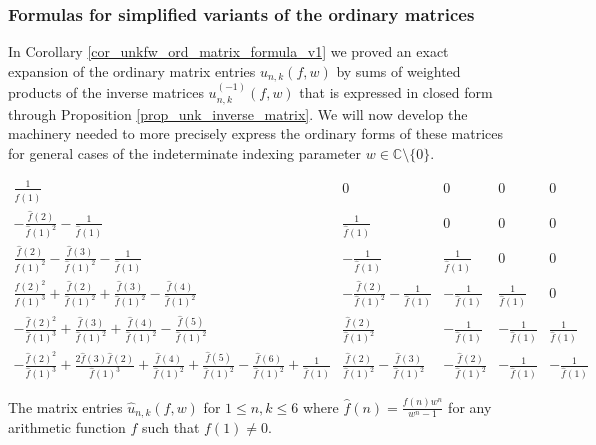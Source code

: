 \documentclass[12pt,reqno,a4letter]{article}
\numberwithin{figure}{section}
\numberwithin{table}{section}
\numberwithin{equation}{section}
\theoremstyle{plain}
\numberwithin{theorem}{section}
\theoremstyle{definition}
\begin{document}
\subsubsection{Formulas for simplified variants of the ordinary matrices} 
\label{subSection_formulas_for_ordinary_matrices} 

In Corollary \ref{cor_unkfw_ord_matrix_formula_v1} we proved an exact 
expansion of the ordinary matrix entries $u_{n,k}(f, w)$ by sums of 
weighted products of the inverse matrices $u_{n,k}^{(-1)}(f, w)$ that is expressed in 
closed form through Proposition \ref{prop_unk_inverse_matrix}. 
We will now develop the machinery needed to more precisely 
express the ordinary forms of these matrices for 
general cases of the indeterminate indexing parameter $w \in \mathbb{C} \setminus \{0\}$. 

\begin{table}[ht!] 

\begin{equation*} 
\boxed{
\begin{array}{lllll}
 \frac{1}{\widehat{f}(1)} & 0 & 0 & 0 & 0 \\
 -\frac{\widehat{f}(2)}{\widehat{f}(1)^2}-\frac{1}{\widehat{f}(1)} & \frac{1}{\widehat{f}(1)} & 0 & 0 & 0 \\
 \frac{\widehat{f}(2)}{\widehat{f}(1)^2}-\frac{\widehat{f}(3)}{\widehat{f}(1)^2}-\frac{1}{\widehat{f}(1)} & -\frac{1}{\widehat{f}(1)} & \frac{1}{\widehat{f}(1)} & 0 & 0 \\
 \frac{\widehat{f}(2)^2}{\widehat{f}(1)^3}+\frac{\widehat{f}(2)}{\widehat{f}(1)^2}+\frac{\widehat{f}(3)}{\widehat{f}(1)^2}-\frac{\widehat{f}(4)}{\widehat{f}(1)^2} &
   -\frac{\widehat{f}(2)}{\widehat{f}(1)^2}-\frac{1}{\widehat{f}(1)} & -\frac{1}{\widehat{f}(1)} & \frac{1}{\widehat{f}(1)} & 0 \\
 -\frac{\widehat{f}(2)^2}{\widehat{f}(1)^3}+\frac{\widehat{f}(3)}{\widehat{f}(1)^2}+\frac{\widehat{f}(4)}{\widehat{f}(1)^2}-\frac{\widehat{f}(5)}{\widehat{f}(1)^2} &
   \frac{\widehat{f}(2)}{\widehat{f}(1)^2} & -\frac{1}{\widehat{f}(1)} & -\frac{1}{\widehat{f}(1)} & \frac{1}{\widehat{f}(1)} \\
-\frac{\widehat{f}(2)^2}{\widehat{f}(1)^3}+\frac{2 \widehat{f}(3)
   \widehat{f}(2)}{\widehat{f}(1)^3}+\frac{\widehat{f}(4)}{\widehat{f}(1)^2}+\frac{\widehat{f}(5)}{\widehat{f}(1)^2}-\frac{\widehat{f}(6)}{\widehat{f}(1)^2}+\frac{1}{\widehat{f}(1)} &
   \frac{\widehat{f}(2)}{\widehat{f}(1)^2}-\frac{\widehat{f}(3)}{\widehat{f}(1)^2} & 
   -\frac{\widehat{f}(2)}{\widehat{f}(1)^2} & -\frac{1}{\widehat{f}(1)} &
   -\frac{1}{\widehat{f}(1)}
\end{array}
}
\end{equation*} 

\caption[Symbolic factorization matrices for type II GCD sums]{
	 The matrix entries $\widehat{u}_{n,k}(f, w)$ for $1 \leq n,k \leq 6$ where 
	 $\hat{f}(n) = \frac{f(n) w^n}{w^n-1}$ for any arithmetic function $f$ such that $f(1) \neq 0$.}
\label{table_simplifies_unkfw} 

\end{table}  
\end{document}
